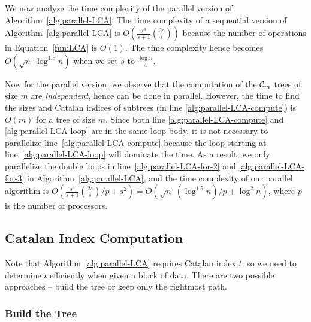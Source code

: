 We now analyze the time complexity of the parallel version of
Algorithm~\ref{alg:parallel-LCA}.  The time complexity of a sequential
version of Algorithm~\ref{alg:parallel-LCA} is $O(\frac{s^3}{s+1}
\binom{2s}{s})$ because the number of operations in
Equation~\ref{fun:LCA} is $O(1)$.  The time complexity hence becomes
$O(\sqrt{n} \; \log ^{1.5} n)$ when we set $s$ to $\frac{\log n}{4}$.

Now for the parallel version, we observe that the computation of the
${\cal C}_m$ trees of size $m$ are {\em independent}, hence can be done
in parallel.  However, the time to find the sizes and Catalan indices of
subtrees (in line \ref{alg:parallel-LCA-compute}) is $O(m)$ for a tree
of size $m$.  Since both line \ref{alg:parallel-LCA-compute} and
\ref{alg:parallel-LCA-loop} are in the same loop body, it is not
necessary to parallelize line~\ref{alg:parallel-LCA-compute} because the
loop starting at line~\ref{alg:parallel-LCA-loop} will dominate the
time.  As a result, we only parallelize the double loops in
line~\ref{alg:parallel-LCA-for-2} and \ref{alg:parallel-LCA-for-3} in
Algorithm~\ref{alg:parallel-LCA}, and the time complexity of our
parallel algorithm is $O(\frac{s^3}{s+1} \binom{2s}{s} / p + s^2) =
O(\sqrt{n} \; (\log^{1.5} n) / p + \log^2 n )$, where $p$ is the number
of processors.



\subsection{Catalan Index Computation}

Note that Algorithm~\ref{alg:parallel-LCA} requires Catalan index $t$,
so we need to determine $t$ efficiently when given a block of data.
There are two possible approaches -- build the tree or keep only the
rightmost path.


\subsubsection{Build the Tree}

